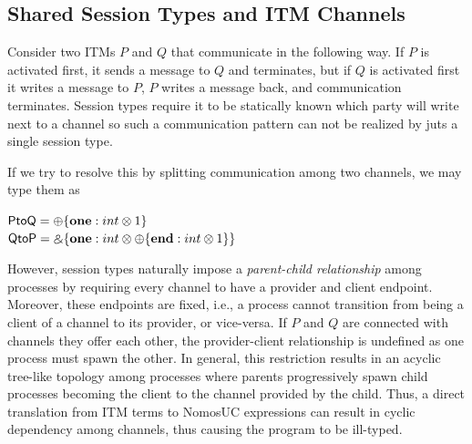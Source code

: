 \subsection{Shared Session Types and ITM Channels}
\label{subsec:communicators}

Consider two ITMs $P$ and $Q$ that communicate in the following way. If $P$ is activated first,
it sends a message to $Q$ and terminates, but if $Q$ is activated first it writes a message to $P$, 
$P$ writes a message back, and communication terminates.
Session types require it to be statically known which party will write next to a channel so such
a communication pattern can not be realized by juts a single session type.

If we try to resolve this by splitting communication among two channels, we may type them as
\vspace{2mm}

{\centering
 $\mathsf{PtoQ} = \oplus \{ \mathbf{one}: int \otimes 1 \}$ \\
 $\mathsf{QtoP} = \mathbin{\binampersand} \{ \mathbf{one}: int \otimes \oplus \{ \mathbf{end}: int \otimes 1 \} \}$
\par}
\vspace{2mm}
However, session types naturally impose a \emph{parent-child relationship} among processes by requiring
every channel to have a provider and client endpoint.
Moreover, these endpoints are fixed, i.e., a process cannot transition from being a client of
a channel to its provider, or vice-versa.
If $P$ and $Q$ are connected with channels they offer each other, the provider-client relationship
is undefined as one process must spawn the other.
In general, this restriction results in an acyclic tree-like topology among processes where parents progressively
spawn child processes becoming the client to the channel provided by the child.
Thus, a direct translation from ITM terms to NomosUC expressions can result in cyclic
dependency among channels, thus causing the program to be ill-typed.

